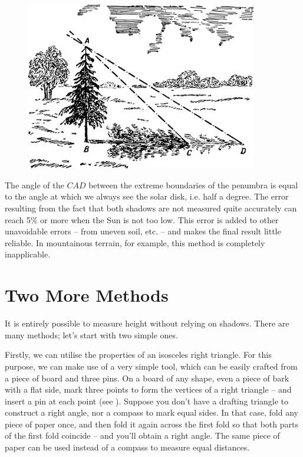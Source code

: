\begin{figure}[h!]
\centering
\includegraphics[width=0.9\textwidth]{figures/ch-01/fig-01-03.pdf}
\end{figure}


The angle of the $CAD$ between the extreme boundaries of the penumbra is equal to the angle at which we always see the solar disk, i.e. half a degree. The error resulting from the fact that both shadows are not measured quite accurately can reach 5\% or more when the Sun is not too low. This error is added to other unavoidable errors -- from uneven soil, etc. -- and makes the final result little reliable. In mountainous terrain, for example, this method is completely inapplicable.

\section{Two More Methods}
\label{sec-1.2}

It is entirely possible to measure height without relying on shadows. There are many methods; let's start with two simple ones.

Firstly, we can utilise the properties of an isosceles right triangle. For this purpose, we can make use of a very simple tool, which can be easily crafted from a piece of board and three pins. On a board of any shape, even a piece of bark with a flat side, mark three points to form the vertices of a right triangle -- and insert a pin at each point (see ). Suppose you don't have a drafting triangle to construct a right angle, nor a compass to mark equal sides. In that case, fold any piece of paper once, and then fold it again across the first fold so that both parts of the first fold coincide -- and you'll obtain a right angle. The same piece of paper can be used instead of a compass to measure equal distances.

